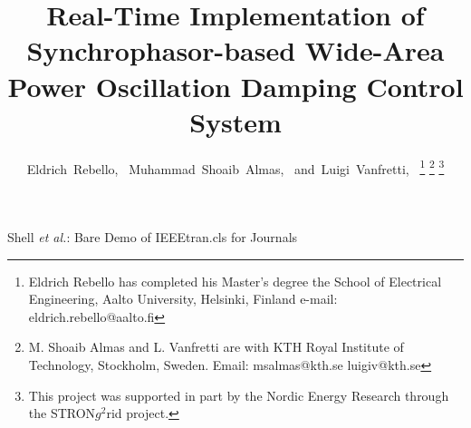 \documentclass[journal]{IEEEtran}
\begin{document}
%
\title{Real-Time Implementation of Synchrophasor-based Wide-Area Power Oscillation Damping Control System}
%
%
%

\author{Eldrich~Rebello,~
        Muhammad~Shoaib~Almas,~
        and~Luigi~Vanfretti,~%
\thanks{Eldrich Rebello has completed his Master's degree the School of Electrical Engineering, Aalto University, Helsinki, Finland
e-mail: eldrich.rebello@aalto.fi}%
\thanks{M. Shoaib Almas and L. Vanfretti are with KTH Royal Institute of Technology, Stockholm, Sweden. Email: msalmas@kth.se luigiv@kth.se}%
\thanks{This project was supported in part by the Nordic
Energy Research through the STRON$g^{2}$rid project.}}

% 
%



%
{Shell \MakeLowercase{\textit{et al.}}: Bare Demo of IEEEtran.cls for Journals}
% 
\end{document}

